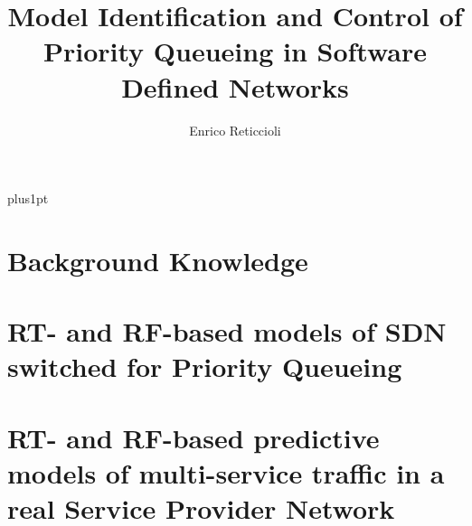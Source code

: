 \documentclass[12pt, a4paper, twoside, openright]{ociamthesis}  %
\title{Model Identification and Control of Priority Queueing in Software Defined Networks} %
\author{Enrico Reticcioli}             %
\begin{document}
\baselineskip=18pt plus1pt

\setcounter{secnumdepth}{4}
\setcounter{tocdepth}{4}

\maketitle                  %




\begin{romanpages}          %
\tableofcontents            %
\listoffigures              %
\listoftables               %
\end{romanpages}            %

%



\chapter{Background Knowledge}


%
\chapter{RT- and RF-based models of SDN switched for Priority Queueing} \label{chap_SDNNetSim}


\chapter{RT- and RF-based predictive models of multi-service traffic in a real Service Provider Network}

\end{document}
